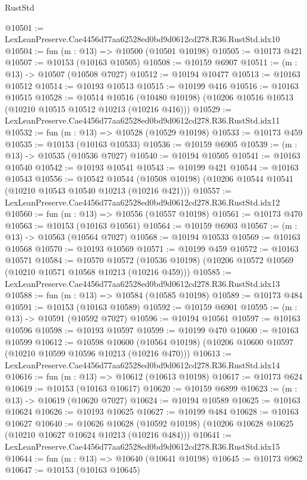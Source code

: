 \begin{lexlean}{RustStd}
\begin{coremodule}
@10501 := LexLeanPreserve.Cae4456d77aa62528ed0bd9d0612cd278.R36.RustStd.idx10
@10504 := fun (m : @13) => @10500 (@10501 @10198)
@10505 := @10173 @421
@10507 := @10153 (@10163 @10505)
@10508 := @10159 @6907
@10511 := (m : @13) -> @10507 (@10508 @7027)
@10512 := @10194 @10477
@10513 := @10163 @10512
@10514 := @10193 @10513
@10515 := @10199 @416
@10516 := @10163 @10515
@10528 := @10514
    @10516
    (@10480 @10198)
    (@10206 @10516 @10513 (@10210 @10515 @10512 @10213 (@10216 @416)))
@10529 := LexLeanPreserve.Cae4456d77aa62528ed0bd9d0612cd278.R36.RustStd.idx11
@10532 := fun (m : @13) => @10528 (@10529 @10198)
@10533 := @10173 @459
@10535 := @10153 (@10163 @10533)
@10536 := @10159 @6905
@10539 := (m : @13) -> @10535 (@10536 @7027)
@10540 := @10194 @10505
@10541 := @10163 @10540
@10542 := @10193 @10541
@10543 := @10199 @421
@10544 := @10163 @10543
@10556 := @10542
    @10544
    (@10508 @10198)
    (@10206 @10544 @10541 (@10210 @10543 @10540 @10213 (@10216 @421)))
@10557 := LexLeanPreserve.Cae4456d77aa62528ed0bd9d0612cd278.R36.RustStd.idx12
@10560 := fun (m : @13) => @10556 (@10557 @10198)
@10561 := @10173 @470
@10563 := @10153 (@10163 @10561)
@10564 := @10159 @6903
@10567 := (m : @13) -> @10563 (@10564 @7027)
@10568 := @10194 @10533
@10569 := @10163 @10568
@10570 := @10193 @10569
@10571 := @10199 @459
@10572 := @10163 @10571
@10584 := @10570
    @10572
    (@10536 @10198)
    (@10206 @10572 @10569 (@10210 @10571 @10568 @10213 (@10216 @459)))
@10585 := LexLeanPreserve.Cae4456d77aa62528ed0bd9d0612cd278.R36.RustStd.idx13
@10588 := fun (m : @13) => @10584 (@10585 @10198)
@10589 := @10173 @484
@10591 := @10153 (@10163 @10589)
@10592 := @10159 @6901
@10595 := (m : @13) -> @10591 (@10592 @7027)
@10596 := @10194 @10561
@10597 := @10163 @10596
@10598 := @10193 @10597
@10599 := @10199 @470
@10600 := @10163 @10599
@10612 := @10598
    @10600
    (@10564 @10198)
    (@10206 @10600 @10597 (@10210 @10599 @10596 @10213 (@10216 @470)))
@10613 := LexLeanPreserve.Cae4456d77aa62528ed0bd9d0612cd278.R36.RustStd.idx14
@10616 := fun (m : @13) => @10612 (@10613 @10198)
@10617 := @10173 @624
@10619 := @10153 (@10163 @10617)
@10620 := @10159 @6899
@10623 := (m : @13) -> @10619 (@10620 @7027)
@10624 := @10194 @10589
@10625 := @10163 @10624
@10626 := @10193 @10625
@10627 := @10199 @484
@10628 := @10163 @10627
@10640 := @10626
    @10628
    (@10592 @10198)
    (@10206 @10628 @10625 (@10210 @10627 @10624 @10213 (@10216 @484)))
@10641 := LexLeanPreserve.Cae4456d77aa62528ed0bd9d0612cd278.R36.RustStd.idx15
@10644 := fun (m : @13) => @10640 (@10641 @10198)
@10645 := @10173 @962
@10647 := @10153 (@10163 @10645)

\end{coremodule}
\end{lexlean}
